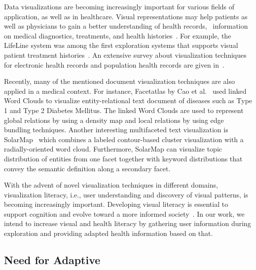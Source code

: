 Data visualizations are becoming increasingly important for various fields of application, as well as in healthcare. 
%
Visual representations may help patients as well as physicians to gain a better understanding of health records, \eg\ information on medical diagnostics, treatments, and health histories~\cite{HCI-039}. 
%
For example, the LifeLine system was among the first exploration systems that supports visual patient treatment histories~\cite{10.1145/286498.286513}. 
%
An extensive survey about visualization techniques for electronic health records and population health records are given in~\cite{DBLP:journals/cgf/WangL22}.


Recently, many of the mentioned document visualization techniques are also applied in a medical context. 
%
For instance, Facetatlas by Cao et al.~\cite{5613456} used linked Word Clouds to visualize entity-relational text document of diseases such as Type 1 and Type 2 Diabetes
Mellitus. 
%
The linked Word Clouds are used to represent global relations by using a density map and local relations by using edge bundling techniques. 
%
Another interesting multifaceted text visualization is SolarMap~\cite{6137214} which combines a labeled contour-based cluster visualization with a radially-oriented word cloud.
%
Furthermore, SolarMap can visualize topic distribution of entities from one facet together with keyword distributions that convey the semantic definition along a secondary facet.


With the advent of novel visualization techniques in different domains, visualization literacy, i.e., user understanding and discovery of visual patterns, is becoming increasingly important. 
%
Developing visual literacy is essential to support cognition and evolve toward a more informed society~\cite{doi:10.1177/14738716221081831}. 
%
In our work, we intend to increase visual and health literacy by gathering user information during exploration and providing adapted health information based on that.



\subsection{Need for Adaptive \chis} \label{subsec:chis}

